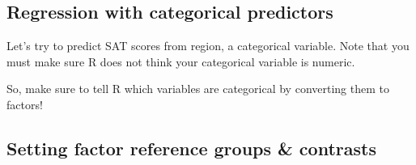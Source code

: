 \documentclass[
]{book}
\newenvironment{Shaded}{\begin{snugshade}}{\end{snugshade}}
\newcommand{\CommentTok}[1]{\textcolor[rgb]{0.56,0.35,0.01}{\textit{#1}}}
\newcommand{\DataTypeTok}[1]{\textcolor[rgb]{0.13,0.29,0.53}{#1}}
\newcommand{\DecValTok}[1]{\textcolor[rgb]{0.00,0.00,0.81}{#1}}
\newcommand{\KeywordTok}[1]{\textcolor[rgb]{0.13,0.29,0.53}{\textbf{#1}}}
\newcommand{\NormalTok}[1]{#1}
\newcommand{\OperatorTok}[1]{\textcolor[rgb]{0.81,0.36,0.00}{\textbf{#1}}}
\newcommand{\StringTok}[1]{\textcolor[rgb]{0.31,0.60,0.02}{#1}}
\begin{document}
\hypertarget{regression-with-categorical-predictors}{%
\subsection{Regression with categorical predictors}\label{regression-with-categorical-predictors}}

Let's try to predict SAT scores from region, a categorical variable.
Note that you must make sure R does not think your categorical variable is numeric.

\begin{Shaded}
\end{Shaded}

\begin{Shaded}
\end{Shaded}

So, make sure to tell R which variables are categorical by converting them to factors!

\hypertarget{setting-factor-reference-groups-contrasts}{%
\subsection{Setting factor reference groups \& contrasts}\label{setting-factor-reference-groups-contrasts}}
\end{document}
